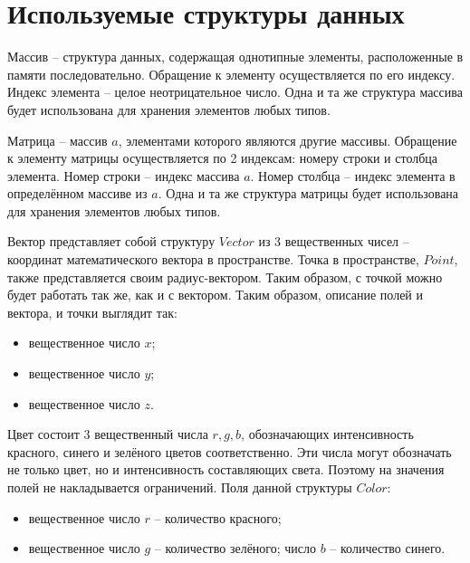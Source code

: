 \section{Используемые структуры данных} {
    Массив -- структура данных, содержащая однотипные элементы,
    расположенные в памяти последовательно.
    Обращение к элементу осуществляется по его индексу.
    Индекс элемента -- целое неотрицательное число.
    Одна и та же структура массива будет использована для хранения
    элементов любых типов.
    
    Матрица -- массив $a$, элементами которого являются другие массивы.
    Обращение к элементу матрицы осуществляется по 2 индексам:
    номеру строки и столбца элемента.
    Номер строки -- индекс массива $a$.
    Номер столбца -- индекс элемента в определённом массиве из $a$.
    Одна и та же структура матрицы будет использована для хранения
    элементов любых типов.
    
    Вектор представляет собой структуру $Vector$ из  3 вещественных чисел --
    координат математического вектора в пространстве.
    Точка в пространстве, $Point$, также представляется своим радиус-вектором.
    Таким образом, с точкой можно будет работать так же, как и с вектором.
    Таким образом, описание полей и вектора, и точки выглядит так:
    \begin{itemize}
        \item вещественное число $x$;
        \item вещественное число $y$;
        \item вещественное число $z$.
    \end{itemize}
    
    Цвет состоит 3 вещественный числа $r, g, b$, обозначающих интенсивность
    красного, синего и зелёного цветов соответственно.
    Эти числа могут обозначать не только цвет,
    но и интенсивность составляющих света.
    Поэтому на значения полей не накладывается ограничений.
    Поля данной структуры $Color$:
    \begin{itemize}
        \item вещественное число $r$ -- количество красного;
        \item вещественное число $g$ -- количество зелёного;
         число $b$ -- количество синего.
    \end{itemize}
    
}

